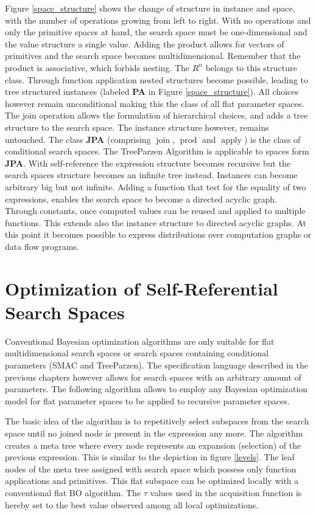 \documentclass[english]{article}
\newcommand{\join}{\operatorname{join}}
\newcommand{\apply}{\operatorname{apply}}
\newcommand{\prot}{\operatorname{prod}}
\begin{document}
Figure \ref{space_structure} shows the change of structure in instance and space, with the number of operations growing from left to right.
With no operations and only the primitive spaces at hand, the search space must be one-dimensional and the value structure a single value.
Adding the product allows for vectors of primitives and the search space becomes multidimensional. Remember that the product is associative, which forbids nesting. The $R^n$ belongs to this structure class.
Through function application nested structures become possible, leading to tree structured instances (labeled \textbf{PA} in Figure \ref{space_structure}). All choices however remain unconditional making this the class of all flat parameter spaces.
The join operation allows the formulation of hierarchical choices, and adds a tree structure to the search space. The instance structure however, remains untouched.
The class \textbf{JPA} (comprising $\join$, $\prot$ and $\apply$) is the class of conditional search spaces. The TreeParzen Algorithm is applicable to spaces form \textbf{JPA}.
With self-reference the expression structure becomes recursive but the search spaces structure becomes an infinite tree instead. Instances can become arbitrary big but not infinite.
Adding a function that test for the equality of two expressions, enables the search space to become a directed acyclic graph.
Through constants, once computed values can be reused and applied to multiple functions. This extends also the instance structure to directed acyclic graphs. At this point it becomes possible to express distributions over computation graphs or data flow programs.




\section{Optimization of Self-Referential Search Spaces}
Conventional Bayesian optimization algorithms are only suitable for flat multidimensional search spaces or search spaces containing conditional parameters (SMAC and TreeParzen). The specification language described in the previous chapters however allows for search spaces with an arbitrary amount of parameters. The following algorithm allows to employ any Bayesian optimization model for flat parameter spaces to be applied to recursive parameter spaces.

The basic idea of the algorithm is to repetitively select subspaces from the search space until no joined node is present in the expression any more. The algorithm creates a meta tree where every node represents an expansion (selection) of the previous expression. This is similar to the depiction in figure \ref{levels}. The leaf nodes of the meta tree assigned with search space which possess only function applications and primitives. This flat subspace can be optimized locally with a conventional flat BO algorithm. The $\tau$ values used in the acquisition function is hereby set to the best value observed among all local optimizations.
\end{document}
